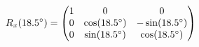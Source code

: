 \documentclass[preview]{standalone}
\begin{document}
\begin{align*}
\special{dvisvgm:raw <g id='unique000'>}R_x(18.5^\circ) = \begin{pmatrix} 1 & 0 & 0 \\ 0 & \cos(18.5^\circ) & -\sin(18.5^\circ) \\ 0 & \sin(18.5^\circ) & \cos(18.5^\circ) \end{pmatrix}\special{dvisvgm:raw </g>}
\end{align*}
\end{document}
